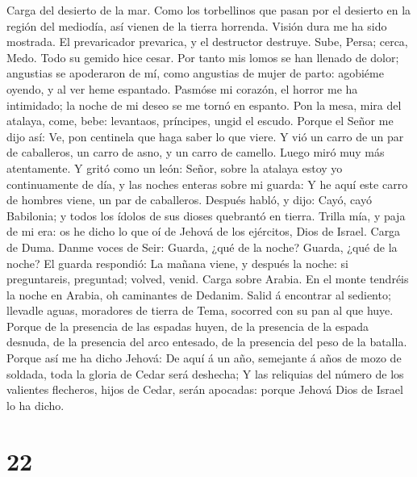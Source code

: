  Carga del desierto de la mar. Como los torbellinos que
pasan por el desierto en la región del mediodía, así vienen de la tierra
horrenda.  Visión dura me ha sido mostrada. El
prevaricador prevarica, y el destructor destruye. Sube, Persa; cerca,
Medo. Todo su gemido hice cesar.  Por tanto mis lomos se
han llenado de dolor; angustias se apoderaron de mí, como angustias de
mujer de parto: agobiéme oyendo, y al ver heme espantado. 
Pasmóse mi corazón, el horror me ha intimidado; la noche de mi deseo se
me tornó en espanto.  Pon la mesa, mira del atalaya, come,
bebe: levantaos, príncipes, ungid el escudo.  Porque el
Señor me dijo así: Ve, pon centinela que haga saber lo que viere.
 Y vió un carro de un par de caballeros, un carro de asno,
y un carro de camello. Luego miró muy más atentamente.  Y
gritó como un león: Señor, sobre la atalaya estoy yo continuamente de
día, y las noches enteras sobre mi guarda:  Y he aquí este
carro de hombres viene, un par de caballeros. Después habló, y dijo:
Cayó, cayó Babilonia; y todos los ídolos de sus dioses quebrantó en
tierra.  Trilla mía, y paja de mi era: os he dicho lo que
oí de Jehová de los ejércitos, Dios de Israel.  Carga de
Duma. Danme voces de Seir: Guarda, ¿qué de la noche? Guarda, ¿qué de la
noche?  El guarda respondió: La mañana viene, y después
la noche: si preguntareis, preguntad; volved, venid. 
Carga sobre Arabia. En el monte tendréis la noche en Arabia, oh
caminantes de Dedanim.  Salid á encontrar al sediento;
llevadle aguas, moradores de tierra de Tema, socorred con su pan al que
huye.  Porque de la presencia de las espadas huyen, de la
presencia de la espada desnuda, de la presencia del arco entesado, de la
presencia del peso de la batalla.  Porque así me ha dicho
Jehová: De aquí á un año, semejante á años de mozo de soldada, toda la
gloria de Cedar será deshecha;  Y las reliquias del
número de los valientes flecheros, hijos de Cedar, serán apocadas:
porque Jehová Dios de Israel lo ha dicho.

\hypertarget{section-21}{%
\section{22}\label{section-21}}

